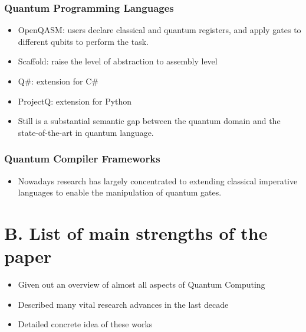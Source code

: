 \documentclass[]{ctexart}
\begin{document}
        \subsubsection*{Quantum Programming Languages}
            \begin{itemize}
                \item OpenQASM: users declare classical and quantum registers, and apply gates to different
                qubits to perform the task.
                \item Scaffold: raise the level of abstraction to assembly level
                \item Q\#: extension for C\#
                \item ProjectQ: extension for Python
                \item Still is a substantial semantic gap between the quantum domain and the state-of-the-art in quantum language.
            \end{itemize}
        \subsubsection*{Quantum Compiler Frameworks}
            \begin{itemize}
                \item Nowadays research has largely concentrated to extending classical imperative languages to enable
                the manipulation of quantum gates.
            \end{itemize}
    \section{B. List of main strengths of the paper}
        \begin{itemize}
            \item Given out an overview of almost all aspects of Quantum Computing
            \item Described many vital research advances in the last decade
            \item Detailed concrete idea of these works
        \end{itemize}
\end{document}
